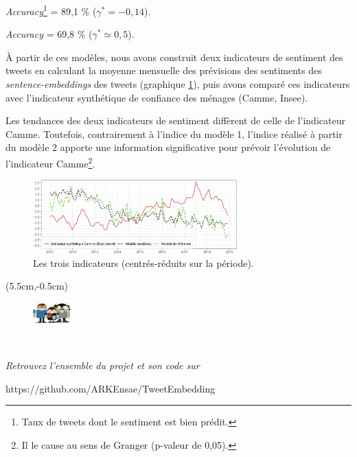 \documentclass[10pt,french,french]{article}
\let\rmarkdownfootnote\footnote%
\def\footnote{\protect\rmarkdownfootnote}
\begin{document}
\begin{multicols}{2}
\faArrowCircleRight{} \emph{Accuracy}\footnote{Taux de tweets dont le sentiment est bien prédit.} =  89,1 \% ($\gamma^* = -0,14$).

\faArrowCircleRight{} \emph{Accuracy} =  69,8 \% ($\gamma^* \simeq 0,5$).

 \end{multicols}

À partir de ces modèles, nous avons construit deux indicateurs de sentiment des tweets en calculant la moyenne mensuelle des prévisions des sentiments des \emph{sentence-embeddings} des tweets (graphique \ref{fig:bslogcam}), puis avons comparé ces indicateurs avec l'indicateur synthétique de confiance des ménages (Camme, Insee).

Les tendances des deux indicateurs de sentiment diffèrent de celle de l'indicateur Camme.
Toutefois, contrairement à l'indice du modèle 1, l'indice réalisé à partir du modèle 2 apporte une information significative pour prévoir l'évolution de l'indicateur Camme\footnote{Il le cause au sens de Granger (p-valeur de 0,05).}.

\begin{figure}[htp]
\begin{center}
\includegraphics[width =0.7\textwidth]{img/rmd-graphSentiments-1}
\captionsetup{margin=0cm,format=hang,justification=justified}
\caption{Les trois indicateurs (centrés-réduits sur la période).}\label{fig:bslogcam}
\end{center}
\end{figure}

\begin{textblock*}{\textwidth}(5.5cm,-0.5cm)
\begin{center}
\begin{minipage}{0.7\textwidth}

\begin{figure}
\includegraphics[height=0.8cm]{img/avatars.png}
\end{figure}

$\phantom{saut}$

\emph{Retrouvez l'ensemble du projet et son code sur}

https://github.com/ARKEnsae/TweetEmbedding

\end{minipage}
\end{center}

\end{textblock*}
\end{document}
